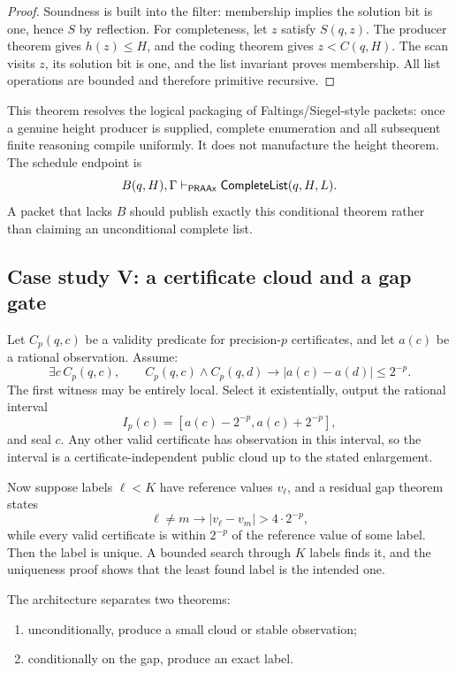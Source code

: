 \begin{proof}
Soundness is built into the filter: membership implies the solution bit is one, hence \(S\) by
reflection.  For completeness, let \(z\) satisfy \(S(q,z)\).  The producer theorem gives
\(h(z)\le H\), and the coding theorem gives \(z<C(q,H)\).  The scan visits \(z\), its solution bit is
one, and the list invariant proves membership.  All list operations are bounded and therefore
primitive recursive.
\end{proof}

This theorem resolves the logical packaging of Faltings/Siegel-style packets: once a genuine height
producer is supplied, complete enumeration and all subsequent finite reasoning compile uniformly.
It does not manufacture the height theorem.  The schedule endpoint is
\[
 B(q,H),\Gamma\vdash_{\mathsf{PRAAx}}\mathsf{CompleteList}(q,H,L).
\]
A packet that lacks \(B\) should publish exactly this conditional theorem rather than claiming an
unconditional complete list.

\subsection{Case study V: a certificate cloud and a gap gate}

Let \(C_p(q,c)\) be a validity predicate for precision-\(p\) certificates, and let \(a(c)\) be a
rational observation.  Assume:
\[
 \exists c\,C_p(q,c),
 \qquad
 C_p(q,c)\land C_p(q,d)\to |a(c)-a(d)|\le2^{-p}.
\]
The first witness may be entirely local.  Select it existentially, output the rational interval
\[
 I_p(c)=[a(c)-2^{-p},a(c)+2^{-p}],
\]
and seal \(c\).  Any other valid certificate has observation in this interval, so the interval is a
certificate-independent public cloud up to the stated enlargement.

Now suppose labels \(\ell<K\) have reference values \(v_\ell\), and a residual gap theorem states
\[
 \ell\ne m\to |v_\ell-v_m|>4\cdot2^{-p},
\]
while every valid certificate is within \(2^{-p}\) of the reference value of some label.  Then the
label is unique.  A bounded search through \(K\) labels finds it, and the uniqueness proof shows that
the least found label is the intended one.

The architecture separates two theorems:

\begin{enumerate}
\item unconditionally, produce a small cloud or stable observation;
\item conditionally on the gap, produce an exact label.
\end{enumerate}


